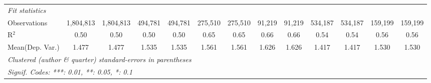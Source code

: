 \begin{tabular}{lcccccccccccc}
   \midrule
   \emph{Fit statistics}\\
   Observations                             & 1,804,813      & 1,804,813   & 494,781        & 494,781  & 275,510       & 275,510       & 91,219        & 91,219        & 534,187        & 534,187        & 159,199       & 159,199\\  
   R$^2$                                    & 0.50           & 0.50        & 0.50           & 0.50     & 0.65          & 0.65          & 0.66          & 0.66          & 0.54           & 0.54           & 0.56          & 0.56\\  
Mean(Dep. Var.) & 1.477 & 1.477 & 1.535 & 1.535 & 1.561 & 1.561 & 1.626 & 1.626 & 1.417 & 1.417 & 1.530 & 1.530 \\
   \midrule \midrule
   \multicolumn{13}{l}{\emph{Clustered (author \& quarter) standard-errors in parentheses}}\\
   \multicolumn{13}{l}{\emph{Signif. Codes: ***: 0.01, **: 0.05, *: 0.1}}\\
\end{tabular}
\par\endgroup
